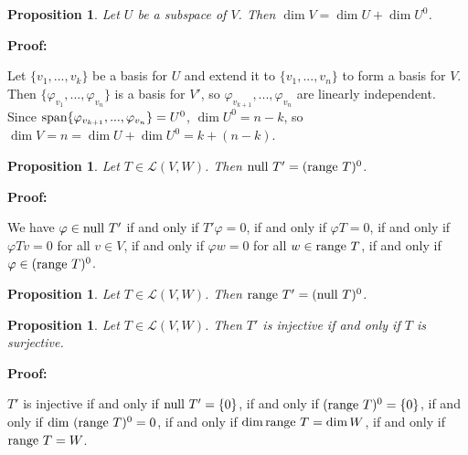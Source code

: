 \documentclass{article}
\theoremstyle{colontheorem}
\newtheorem{proposition}[theorem]{Proposition}
\newcommand{\Span}{\textnormal{span}}
\newcommand{\Null}{\textnormal{null }}
\newcommand{\Range}{\textnormal{range }}
\newenvironment{Proposition}
{
	\begin{mdframed}[backgroundcolor=TheoremOrange!10]
	\begin{proposition}
}
{
	\end{proposition}
	\end{mdframed}
	
	\vspace{.15in}
}
\newenvironment{Proof}
{
	\vspace{-.3in}
	
	\begin{mdframed}[backgroundcolor=ProofPurple!10]
	\textbf{Proof:}%
}
{
	\end{mdframed}
	
	\vspace{.15in}
}
\begin{document}
\begin{Proposition}
	
	Let $U$ be a subspace of $V$. Then $\dim V = \dim U + \dim U^0$.
	
\end{Proposition}



\begin{Proof}
	Let $\{v_1, ..., v_k\}$ be a basis for $U$ and extend it to $\{v_1, ..., v_n\}$ to form a basis for $V$. Then $\{\varphi_{v_1}, ..., \varphi_{v_n}\}$ is a basis for $V'$, so $\varphi_{v_{k+1}}, ..., \varphi_{v_n}$ are linearly independent. Since $\Span \{\varphi_{v_{k+1}}, ..., \varphi_{v_n}\} = U^0$, $\dim U^0 = n-k$, so $\dim V = n = \dim U + \dim U^0 = k + (n - k)$.
	
\end{Proof}




\begin{Proposition}
	
	Let $T \in \mathcal{L}(V,W)$. Then $\Null T' = (\Range T)^0$.
	
\end{Proposition}



\begin{Proof}
	We have $\varphi \in \Null T'$ if and only if $T'\varphi = 0$, if and only if $\varphi T = 0$, if and only if $\varphi Tv = 0$ for all $v \in V$, if and only if $\varphi w = 0$ for all $w \in \Range T$, if and only if $\varphi \in (\Range T)^0$.
	
\end{Proof}



\begin{Proposition}
	
	Let $T \in \mathcal{L}(V,W)$. Then $\Range T' = (\Null T)^0$.
	
\end{Proposition}



\begin{Proposition}
	
	Let $T \in \mathcal{L}(V,W)$. Then $T'$ is injective if and only if $T$ is surjective.
	
\end{Proposition}



\begin{Proof}
	$T'$ is injective if and only if $\Null T' = \{0\}$, if and only if $(\Range T)^0 = \{0\}$, if and only if $\dim\  (\Range T)^0 = 0$, if and only if $\dim \Range T = \dim W$, if and only if $\Range T = W$.
	
\end{Proof}
\end{document}
